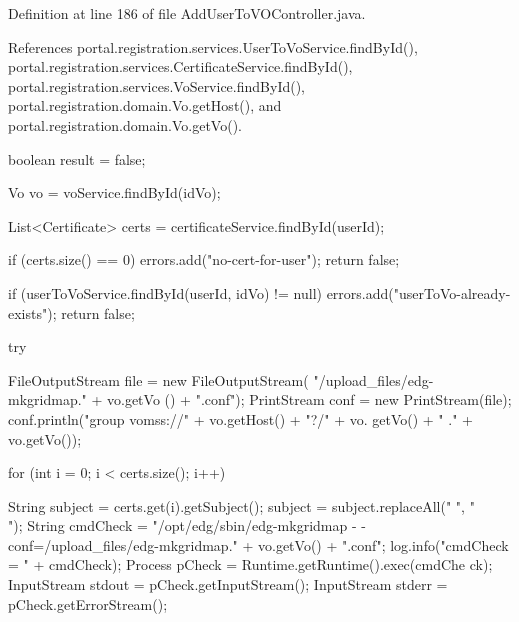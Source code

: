 Definition at line 186 of file AddUserToVOController.java.



References portal.registration.services.UserToVoService.findById(), portal.registration.services.CertificateService.findById(), portal.registration.services.VoService.findById(), portal.registration.domain.Vo.getHost(), and portal.registration.domain.Vo.getVo().


\begin{DoxyCode}
                                                                           {
                boolean result = false;

                Vo vo = voService.findById(idVo);

                List<Certificate> certs = certificateService.findById(userId);

                if (certs.size() == 0) {
                        errors.add("no-cert-for-user");
                        return false;
                }

                if (userToVoService.findById(userId, idVo) != null) {
                        errors.add("userToVo-already-exists");
                        return false;
                }

                try {

                        FileOutputStream file = new FileOutputStream(
                                        "/upload_files/edg-mkgridmap." + vo.getVo
      () + ".conf");
                        PrintStream conf = new PrintStream(file);
                        conf.println("group vomss://" + vo.getHost() + "?/" + vo.
      getVo()
                                        + " ." + vo.getVo());

                        for (int i = 0; i < certs.size(); i++) {
                                String subject = certs.get(i).getSubject();
                                subject = subject.replaceAll(" ", "\\ ");
                                String cmdCheck = "/opt/edg/sbin/edg-mkgridmap  -
      -conf=/upload_files/edg-mkgridmap."
                                                + vo.getVo() + ".conf";
                                log.info("cmdCheck = " + cmdCheck);
                                Process pCheck = Runtime.getRuntime().exec(cmdChe
      ck);
                                InputStream stdout = pCheck.getInputStream();
                                InputStream stderr = pCheck.getErrorStream();

}}}
\end{DoxyCode}
